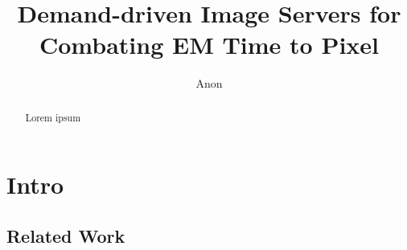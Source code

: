 \documentclass{llncs}
\begin{document}
%
\title{Demand-driven Image Servers for Combating EM Time to Pixel}
%
%
\author{Anon}
%
%
%

\maketitle              %

\begin{abstract}
Lorem ipsum
\end{abstract}
%
\section{Intro}
%
%
\subsection{Related Work}
%

\section{}

%
%
\begin{thebibliography}{}

\end{thebibliography}
\end{document}
